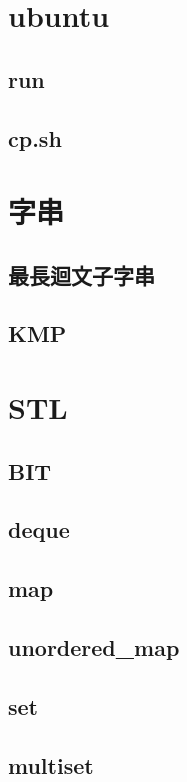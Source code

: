 \section{ubuntu}
    \subsection{run}
        
    \subsection{cp.sh}
        

\section{字串}
    \subsection{最長迴文子字串}
        
    \subsection{KMP}
        
\section{STL}
    \subsection{BIT}
        
    \subsection{deque}
        
    \subsection{map}
        
    \subsection{unordered\_map}
        
    \subsection{set}
        
    \subsection{multiset}
        
